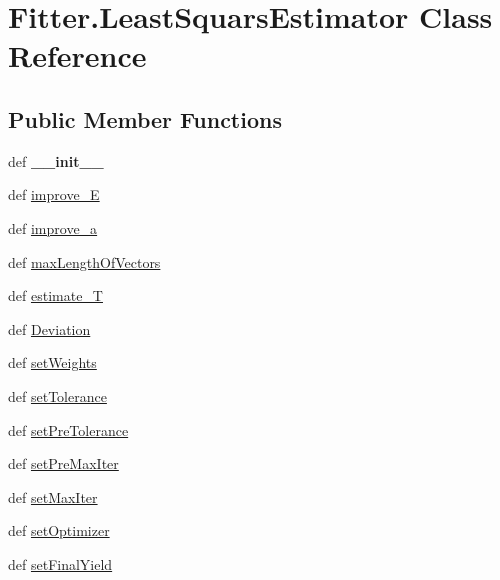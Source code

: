 \hypertarget{classFitter_1_1LeastSquarsEstimator}{\section{\-Fitter.\-Least\-Squars\-Estimator \-Class \-Reference}
\label{classFitter_1_1LeastSquarsEstimator}
}
\subsection*{\-Public \-Member \-Functions}
\begin{DoxyCompactItemize}
\item 
\hypertarget{classFitter_1_1LeastSquarsEstimator_aea7092ad8516d452c695b8ed01634029}{def {\bfseries \-\_\-\-\_\-init\-\_\-\-\_\-}}\label{classFitter_1_1LeastSquarsEstimator_aea7092ad8516d452c695b8ed01634029}

\item 
def \hyperlink{classFitter_1_1LeastSquarsEstimator_aff91169bf33f8f810b1e98ac98a23c62}{improve\-\_\-\-E}
\item 
def \hyperlink{classFitter_1_1LeastSquarsEstimator_a15492452ccc16caf31bf234bcc702a5d}{improve\-\_\-a}
\item 
def \hyperlink{classFitter_1_1LeastSquarsEstimator_a25552eed081a2291c17fe1fda3896cd1}{max\-Length\-Of\-Vectors}
\item 
def \hyperlink{classFitter_1_1LeastSquarsEstimator_adb70f7a05a5bfff482f2d45634960032}{estimate\-\_\-\-T}
\item 
def \hyperlink{classFitter_1_1LeastSquarsEstimator_a90144e4465eb66adf978126a2d09ff54}{\-Deviation}
\item 
def \hyperlink{classFitter_1_1LeastSquarsEstimator_a9c94ff877c2bc358faf8feafb73c3f97}{set\-Weights}
\item 
def \hyperlink{classFitter_1_1LeastSquarsEstimator_abf4a0423ab282f5ebd1e881f94549bce}{set\-Tolerance}
\item 
def \hyperlink{classFitter_1_1LeastSquarsEstimator_aef4c901e6afb654ad2b70bc2960ecadb}{set\-Pre\-Tolerance}
\item 
def \hyperlink{classFitter_1_1LeastSquarsEstimator_a9911d334b53c772a18afba9cb1e54113}{set\-Pre\-Max\-Iter}
\item 
def \hyperlink{classFitter_1_1LeastSquarsEstimator_ab06c721baf4cc0e88ef99b60479080c9}{set\-Max\-Iter}
\item 
def \hyperlink{classFitter_1_1LeastSquarsEstimator_a72a06037b1cfde39955fc412ace06134}{set\-Optimizer}
\item 
def \hyperlink{classFitter_1_1LeastSquarsEstimator_acd0fa0e003dabe354ceb4e0f2fec15ac}{set\-Final\-Yield}
\end{DoxyCompactItemize}
